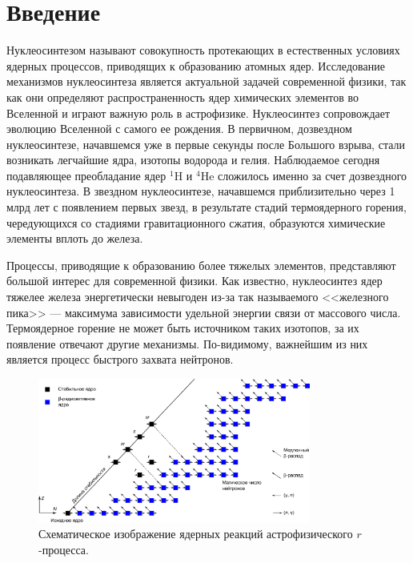 \section{Введение}%
Нуклеосинтезом называют совокупность протекающих в естественных условиях ядерных процессов, приводящих к образованию атомных ядер. Исследование механизмов нуклеосинтеза является актуальной задачей современной физики, так как они определяют распространенность ядер химических элементов во Вселенной и играют важную роль в астрофизике. Нуклеосинтез сопровождает эволюцию Вселенной с самого ее рождения. В первичном, дозвездном нуклеосинтезе, начавшемся уже в первые секунды после Большого взрыва, стали возникать легчайшие ядра, изотопы водорода и гелия. Наблюдаемое сегодня подавляющее преобладание ядер ${}^1$H и ${}^4$He сложилось именно за счет дозвездного нуклеосинтеза. В звездном нуклеосинтезе, начавшемся приблизительно через 1 млрд лет с появлением первых звезд, в результате стадий термоядерного горения, чередующихся со стадиями гравитационного сжатия, образуются химические элементы вплоть до железа. 

Процессы, приводящие к образованию более тяжелых элементов, представляют большой интерес для современной физики. Как известно, нуклеосинтез ядер тяжелее железа энергетически невыгоден из-за так называемого <<железного пика>> --- максимума зависимости удельной энергии связи от массового числа. Термоядерное горение не может быть источником таких изотопов, за их появление отвечают другие механизмы. По-видимому, важнейшим из них является процесс быстрого захвата нейтронов.

\begin{figure}[!b]
  \centering
  \includegraphics[width=0.8\textwidth]{pics/tracks.pdf}
  \caption{Схематическое изображение ядерных реакций астрофизического $r$-процесса.}
  \label{fig:tracks}
\end{figure}

